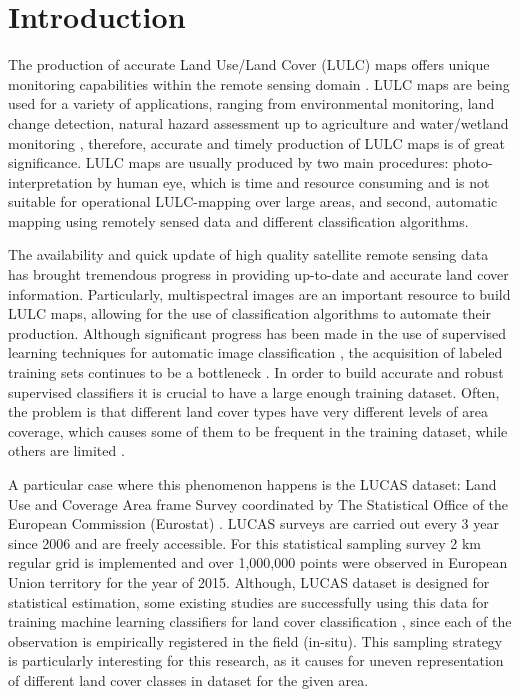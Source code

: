 \documentclass[remotesensing,article,submit,moreauthors,pdftex]{Definitions/mdpi}
\begin{document}
\section{Introduction}
The production of accurate Land Use/Land Cover (LULC) maps offers unique
monitoring capabilities within the remote sensing domain \cite{Mellor2015}. LULC
maps are being used for a variety of applications, ranging from environmental
monitoring, land change detection, natural hazard assessment up to agriculture
and water/wetland monitoring \cite{Khatami2016}, therefore, accurate and timely
production of LULC maps is of great significance. LULC maps are usually
produced by two main procedures: photo-interpretation by human eye, which is
time and resource consuming and is not suitable for operational LULC-mapping
over large areas, and second, automatic mapping using remotely sensed data and
different classification algorithms.

The availability and quick update of high quality satellite remote sensing data
has brought tremendous progress in providing up-to-date and accurate land cover
information. Particularly, multispectral images are an important resource to 
build LULC maps, allowing for the use of classification algorithms to automate 
their production. Although significant progress has been made in the use of 
supervised learning techniques for automatic image classification 
\cite{Tewkesbury2015}, the acquisition of labeled training sets continues to be 
a bottleneck \cite{Rajan2008}. In order to build accurate and robust supervised 
classifiers it is crucial to have a large enough training dataset. Often, the 
problem is that different land cover types have very different levels of area 
coverage, which causes some of them to be frequent in the training dataset, 
while others are limited \cite{Feng2019}.

A particular case where this phenomenon happens is the LUCAS dataset: Land Use
and Coverage Area frame Survey coordinated by The Statistical Office of the
European Commission (Eurostat) \cite{LUCAS2015C1}. LUCAS surveys are carried
out every 3 year since 2006 and are freely accessible.  For this statistical
sampling survey 2 km regular grid is implemented and over 1,000,000 points were
observed in European Union territory for the year of 2015. Although, LUCAS
dataset is designed for  statistical estimation, some existing studies are
successfully using this data for training machine learning classifiers for land
cover classification \cite{Pflugmacher2019, Mack2017}, since each of the
observation is empirically registered in the field (in-situ). This sampling
strategy is particularly interesting for this research, as it causes for uneven
representation of different land cover classes in dataset for the given area.
\end{document}

